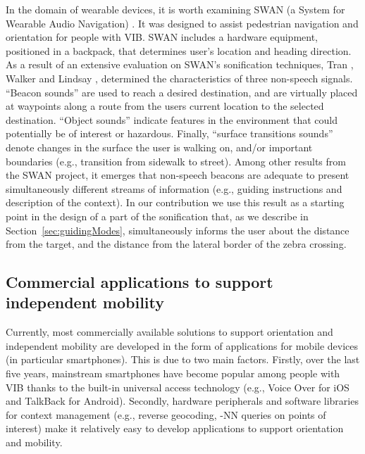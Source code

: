 \documentclass{article}
\begin{document}
In the domain of wearable devices, it is worth examining SWAN (a System for Wearable Audio Navigation) \cite{wilson2007}.
It was designed to assist pedestrian navigation and orientation for people with VIB.
SWAN includes a hardware equipment, positioned in a backpack, that determines user's location and heading direction.
As a result of an extensive evaluation on SWAN's sonification techniques, Tran \cite{tran}, Walker and Lindsay \cite{walker_lindsay}, \cite{wilson2007} determined the characteristics of three non-speech signals. ``Beacon sounds'' are used to reach a desired destination, and are virtually placed at waypoints along a route from the users current location to the selected destination.
``Object sounds'' indicate features in the environment that could potentially be of interest or hazardous.
Finally, ``surface transitions sounds'' denote changes in the surface the user is walking on, and/or important boundaries (e.g., transition from sidewalk to street).
Among other results from the SWAN project, it emerges that non-speech beacons are adequate to present simultaneously different streams of information (e.g., guiding instructions and description of the context).
In our contribution we use this result as a starting point in the design of a part of the sonification that, as we describe in Section~\ref{sec:guidingModes}, simultaneously informs the user about the distance from the target, and the distance from the lateral border of the zebra crossing.

\subsection{Commercial applications to support independent mobility}
\label{sub:apps}
Currently, most commercially available solutions to support orientation and independent mobility are developed in the form of applications for mobile devices (in particular smartphones).
This is due to two main factors. Firstly, over the last five years, mainstream smartphones have become popular among people with VIB thanks to the built-in universal access technology (e.g., Voice Over for iOS and TalkBack for Android).
Secondly, hardware peripherals and software libraries for context management (e.g., reverse geocoding, -NN queries on points of interest) make it relatively easy to develop applications to support orientation and mobility.
\end{document}
